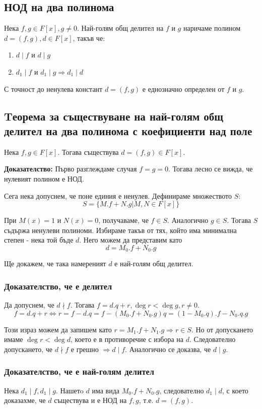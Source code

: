\documentclass[fleqn,12pt]{article}
\begin{document}
\subsection{НОД на два полинома}
Нека $f,g \in F[x], g \neq 0$. Най-голям общ делител на $f$ и $g$ наричаме 
полином $d = (f,g), d \in F[x]$, такъв че:
\begin{enumerate}
    \item $d \mid f$ и $d \mid g$
    \item $d_1 \mid f$ и $d_1 \mid g \Rightarrow d_1 \mid d$
\end{enumerate}

С точност до ненулева констант $d=(f,g)$ е еднозначно определен от $f$ и $g$.

\subsection{Tеорема за съществуване на най-голям общ делител на два полинома с коефициенти над поле}
Нека $f,g \in F[x]$. Тогава съществува $d=(f,g) \in F[x]$.

\textbf{Доказателство: } Първо разглеждаме случая $f = g = 0$. Тогава лесно се вижда, че нулевият полином е НОД.

Сега нека допуснем, че поне единия е ненулев. Дефинираме множеството $S$:
\[ S = \{ M.f + N.g | M,N \in F[x] \} \]

При $M(x) = 1$ и $N(x) = 0$, получаваме, че $f \in S$. Аналогично $g \in S$. 
Тогава $S$ съдържа ненулеви полиноми. Избираме такъв от тях, който има минимална степен
 - нека той бъде $d$. Него можем да представим като
\[ d = M_0.f + N_0.g \]

Ще докажем, че така намереният $d$ е най-голям общ делител.

\subsubsection{Доказателство, че е делител}
Да допуснем, че $d \nmid f$. Тогава $f = d.q + r, \deg r < \deg g, r \neq 0$.
\[ f = d.q + r \Leftrightarrow r = f - d.q = 
f - (M_0 . f + N_0 . g)q = 
(1 - M_0 . q) . f - N_0 . q . g \]

Този израз можем да запишем като $r = M_1 . f + N_1 . g \Rightarrow r \in S$.
Но от допускането имаме $\deg r < \deg d$, което е в противоречие с избора на $d$.
Следователно допускането, че $d \nmid f$ е грешно $\Rightarrow d \mid f$.
Аналогично се доказва, че $d \mid g$.

\subsubsection{Доказателство, че е най-голям делител}
Нека $d_1 \mid f, d_1 \mid g$. Нашетo $d$ има вида $M_0.f + N_0.g$, следователно $d_1 \mid d$, с което
доказахме, че $d$ съществува и е НОД на $f,g$, т.е. $d = (f,g)$.
\end{document}
